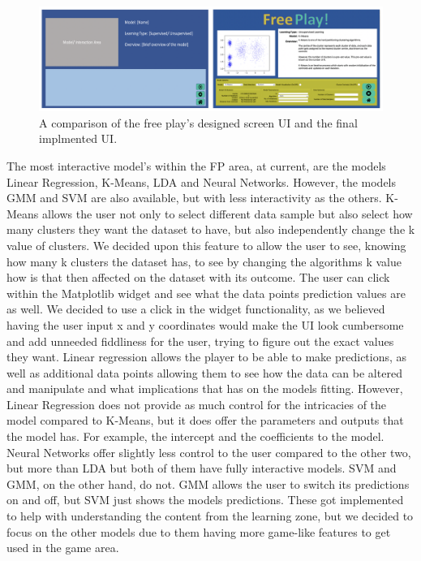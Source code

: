 	\begin{figure}[t]
		\includegraphics[width=15cm]{graphics/free_play.png}
		\caption{A comparison of the free play's designed screen UI and the final implmented UI.}
		\label{fig:ui_fp}
	\end{figure}
	
	The most interactive model's within the FP area, at current, are the models Linear Regression, K-Means, LDA and Neural Networks. However, the models GMM and SVM are also available, but with less interactivity as the others. K-Means allows the user not only to select different data sample but also select how many clusters they want the dataset to have, but also independently change the k value of clusters. We decided upon this feature to allow the user to see, knowing how many k clusters the dataset has, to see by changing the algorithms k value how is that then affected on the dataset with its outcome. The user can click within the Matplotlib widget and see what the data points prediction values are as well. We decided to use a click in the widget functionality, as we believed having the user input x and y coordinates would make the UI look cumbersome and add unneeded fiddliness for the user, trying to figure out the exact values they want. Linear regression allows the player to be able to make predictions, as well as additional data points allowing them to see how the data can be altered and manipulate and what implications that has on the models fitting. However, Linear Regression does not provide as much control for the intricacies of the model compared to K-Means, but it does offer the parameters and outputs that the model has. For example, the intercept and the coefficients to the model. Neural Networks offer slightly less control to the user compared to the other two, but more than LDA but both of them have fully interactive models. SVM and GMM, on the other hand, do not. GMM allows the user to switch its predictions on and off, but SVM just shows the models predictions. These got implemented to help with understanding the content from the learning zone, but we decided to focus on the other models due to them having more game-like features to get used in the game area.
	

